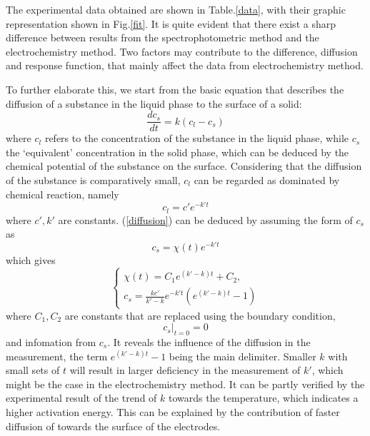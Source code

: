 \documentclass[%
preprint,
 amsmath,amssymb,
 aps,
10.5pt,
]{revtex4-1}
\begin{document}
The experimental data obtained are shown in Table.\ref{data}, with their graphic representation shown in Fig.\ref{fit}. It is
quite evident that there exist a sharp difference between results from the spectrophotometric method and the electrochemistry method. Two factors may contribute to the difference, diffusion and response function, that mainly affect the data from electrochemistry method.

To further elaborate this, we start from the basic equation that describes the diffusion of a substance in the liquid phase to the surface of a solid:
\begin{equation}
	\frac{d c_s}{dt} = k (c_l - c_s)
\label{diffusion}
\end{equation}
where $c_l$ refers to the concentration of the substance in the liquid phase, while $c_s$ the `equivalent' concentration in the solid phase, which can be deduced by the chemical potential of the substance on the surface. Considering that the diffusion of the substance is comparatively small, $c_l$ can be regarded as dominated by chemical reaction, namely
\begin{equation}
	c_l = c' e^{-k't}
\end{equation}
where $c',k'$ are constants. (\ref{diffusion}) can be deduced by assuming the form of $c_s$ as
\begin{equation}
	c_s = \chi(t) e^{-k't}
\end{equation}
which gives
\begin{equation}
\begin{cases}
	\chi(t) = C_1 e^{(k'-k) t} + C_2,\\
	 c_s = \frac{k c'}{k'-k} e^{-k't}(e^{(k'-k)t}-1)
	 \end{cases}
\end{equation}
where $C_1,C_2$ are constants that are replaced using the boundary condition,
\begin{equation}
	c_s \big|_{t=0} = 0
\end{equation}
and infomation from $c_s$.
It reveals the influence of the diffusion in the measurement, the term $e^{(k'-k)t}-1$ being the main delimiter. Smaller $k$ with small sets of $t$ will result in larger deficiency in the measurement of $k'$, which might be the case in the electrochemistry method. It can be partly verified by the experimental result of the trend of $k$ towards the temperature, which indicates a higher activation energy. This can be explained by the contribution of faster diffusion of  towards the surface of the electrodes.
\end{document}
